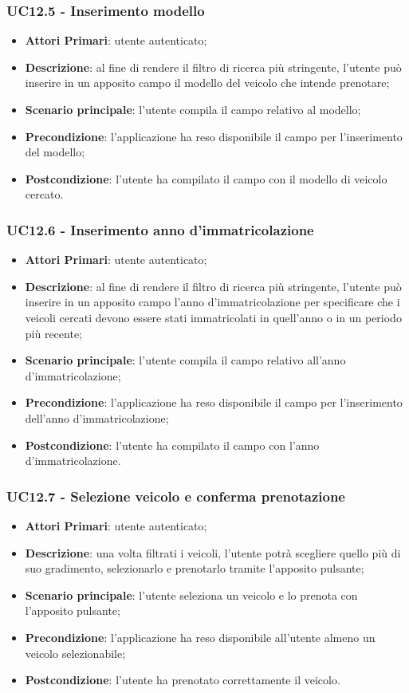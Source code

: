 \subsubsection{UC12.5 - Inserimento modello}
\begin{itemize}
	\item \textbf{Attori Primari}: utente autenticato;
	\item \textbf{Descrizione}: al fine di rendere il filtro di ricerca più stringente, l'utente può inserire in un apposito campo il modello del veicolo che intende prenotare;
	\item \textbf{Scenario principale}: l'utente compila il campo relativo al modello;	
	\item \textbf{Precondizione}: l'applicazione ha reso disponibile il campo per l'inserimento del modello;
	\item \textbf{Postcondizione}: l'utente ha compilato il campo con il modello di veicolo cercato.	
\end{itemize}

\subsubsection{UC12.6 - Inserimento anno d'immatricolazione}
\begin{itemize}
	\item \textbf{Attori Primari}: utente autenticato;
	\item \textbf{Descrizione}: al fine di rendere il filtro di ricerca più stringente, l'utente può inserire in un apposito campo l'anno d'immatricolazione per specificare che i veicoli cercati devono essere stati immatricolati in quell'anno o in un periodo più recente;
	\item \textbf{Scenario principale}: l'utente compila il campo relativo all'anno d'immatricolazione;	
	\item \textbf{Precondizione}: l'applicazione ha reso disponibile il campo per l'inserimento dell'anno d'immatricolazione;
	\item \textbf{Postcondizione}: l'utente ha compilato il campo con l'anno d'immatricolazione.	
\end{itemize}

\subsubsection{UC12.7 - Selezione veicolo e conferma prenotazione}
\begin{itemize}
	\item \textbf{Attori Primari}: utente autenticato;
	\item \textbf{Descrizione}: una volta filtrati i veicoli, l'utente potrà scegliere quello più di suo gradimento, selezionarlo e prenotarlo tramite l'apposito pulsante;
	\item \textbf{Scenario principale}: 
	l'utente seleziona un veicolo e lo prenota con l'apposito pulsante;
	\item \textbf{Precondizione}: l'applicazione ha reso disponibile all'utente almeno un veicolo selezionabile;
	\item \textbf{Postcondizione}: l'utente ha prenotato correttamente il veicolo.
\end{itemize}

